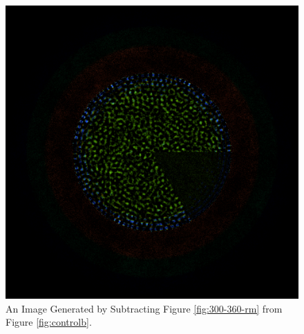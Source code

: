 \begin{figure}[H]
\centering
\includegraphics[width=0.6\linewidth]{figures/300-360/diff-300-360}
\caption{An Image Generated by Subtracting Figure \ref{fig:300-360-rm} from Figure \ref{fig:controlb}.}
\label{fig:300-360-diff}
\end{figure}